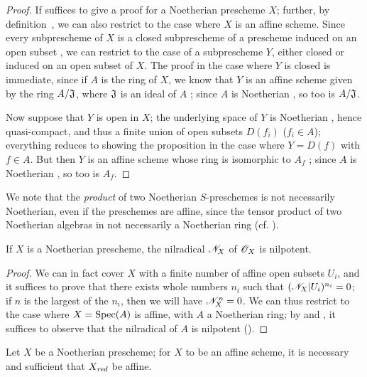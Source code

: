 \begin{proof}
\label{proof-1.6.1.4}
If suffices to give a proof for a Noetherian prescheme $X$;
further, by definition~, we can also restrict to the case where $X$ is an affine scheme.
Since every subprescheme of $X$ is a closed subprescheme of a prescheme induced on an open subset , we can restrict to the case of a subprescheme $Y$, either closed or induced on an open subset of $X$.
The proof in the case where $Y$ is closed is immediate, since if $A$ is the ring of $X$, we know that $Y$ is an affine scheme given by the ring $A/\mathfrak{J}$, where $\mathfrak{J}$ is an ideal of $A$ ;
since $A$ is Noetherian , so too is $A/\mathfrak{J}$.

Now suppose that $Y$ is open in $X$;
the underlying space of $Y$ is Noetherian , hence quasi-compact, and thus a finite union of open subsets $D(f_i)$ ($f_i\in A$);
everything reduces to showing the proposition in the case where $Y=D(f)$ with $f\in A$.
But then $Y$ is an affine scheme whose ring is isomorphic to $A_f$ ;
since $A$ is Noetherian , so too is $A_f$.
\end{proof}

\begin{env}[6.1.5]
\label{1.6.1.5}
We note that the \emph{product} of two Noetherian $S$-preschemes is not necessarily Noetherian, even if the preschemes are affine, since the tensor product of two Noetherian algebras in not necessarily a Noetherian ring (cf. ).
\end{env}

\begin{prop}[6.1.6]
\label{1.6.1.6}
If $X$ is a Noetherian prescheme, the nilradical $\mathscr{N}_X$ of $\mathscr{O}_X$ is nilpotent.
\end{prop}

\begin{proof}
\label{proof-1.6.1.6}
We can in fact cover $X$ with a finite number of affine open subsets $U_i$, and it suffices to prove that there exists whole numbers $n_i$ such that $(\mathscr{N}_X|U_i)^{n_i}=0$;
if $n$ is the largest of the $n_i$, then we will have $\mathscr{N}_X^n=0$.
We can thus restrict to the case where $X={\mathop{\mathrm{Spec}}\nolimits}(A)$ is affine, with $A$ a Noetherian ring;
by  and , it suffices to observe that the nilradical of $A$ is nilpotent (\cite[p.~127, cor.~4]{I-11}).
\end{proof}

\begin{cor}[6.1.7]
\label{1.6.1.7}
Let $X$ be a Noetherian prescheme;
for $X$ to be an affine scheme, it is necessary and sufficient that $X_\emph{red}$ be affine.
\end{cor}

